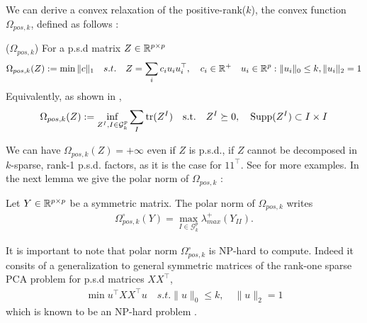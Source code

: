 We can derive a convex relaxation of the positive-rank($k$), the convex function $\Omega_{pos,k}$, defined as follows :
\begin{mydef}
($\Omega_{pos,k}$) For a p.s.d  matrix $Z\in\mathbb{R}^{p\times p}$ 
\begin{align}
\Omega_{pos,k}(Z):=\min \|c\|_1 \quad s.t. \quad Z=\sum_{i} c_i u_i u_{i}^\top, \quad c_i\in \mathbb{R}^{+} \quad u_{i}\in\mathbb{R}^p  :   \|u_{i}\|_0 \leq k, \|u_{i}\|_2 = 1
\end{align}
Equivalently, as shown in \citet{richard2014tight},
\begin{align}
\Omega_{pos,k}(Z):=\inf_{Z^I, I\in\mathcal{G}^p_k} \sum_{I}{\rm tr}(Z^I) \quad \text{s.t.} \quad Z^I\succeq 0 ,\quad{\rm Supp}(Z^I)\subset I\times I
\end{align}
\end{mydef}

We can have $\Omega_{pos,k}(Z)=+\infty$ even if $Z$ is p.s.d., if $Z$ cannot be decomposed in $k$-sparse,  rank-1 p.s.d. factors, as it is the case for $11^{\top}$.  See \citet{richard2014tight} for more examples. In the next lemma we give the polar norm of  $\Omega_{pos,k}$ :

\begin{lemm}
\label{lem:LMO}
Let $Y\in\mathbb{R}^{p\times p}$ be a symmetric matrix. The polar norm of $\Omega_{pos,k}$ writes
\begin{align}
{\Omega_{pos,k}^{\circ}}(Y)= \max_{I\in\mathcal{G}^p_k}\lambda^{+}_{max}(Y_{II}).
\end{align}
\end{lemm}

It is important to note that polar norm $\Omega_{pos,k}^{\circ}$ is NP-hard to compute. Indeed it consits of a generalization to general symmetric matrices of the rank-one sparse PCA problem for p.s.d matrices $XX^{\top}$,
\begin{align*}
\min u^{\top}XX^{\top}u \quad s.t.  \|u\|_0 \leq k,\quad \|u\|_2 = 1
\end{align*}
which is known to be an NP-hard problem \citep{moghaddam2008sparse}.


